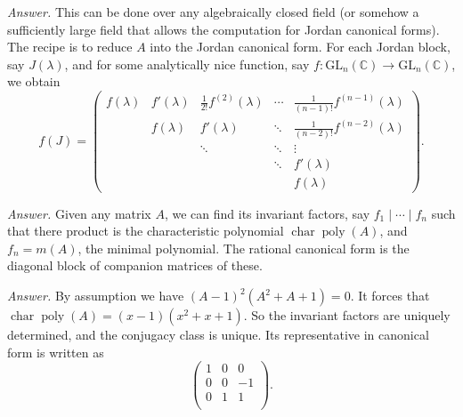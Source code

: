 \documentclass{mathproblems}
\newcommand\C{\mathbb{C}}
\newcommand\GL{\mathrm{GL}}
\begin{document}
\begin{questions}

\textit{Answer.} This can be done over any algebraically closed field (or somehow a sufficiently large field that allows the computation for Jordan canonical forms). The recipe is to reduce $A$ into the Jordan canonical form. For each Jordan block, say $J(\lambda)$, and for some analytically nice function, say $f:\GL_n(\C)\to \GL_n(\C)$, we obtain
$$
f(J)=\begin{pmatrix}
f(\lambda) & f'(\lambda) & \frac{1}{2!}f^{(2)}(\lambda) & \cdots & \frac{1}{(n-1)!}f^{(n-1)}(\lambda)\\
& f(\lambda) & f'(\lambda) & \ddots & \frac{1}{(n-2)!}f^{(n-2)}(\lambda)\\
& & \ddots & \ddots & \vdots \\
& & & \ddots & f'(\lambda) \\
& & & & f(\lambda)
\end{pmatrix}.
$$


\textit{Answer.} Given any matrix $A$, we can find its invariant factors, say $f_1\mid \cdots \mid f_n$ such that there product is the characteristic polynomial $\operatorname{char}\operatorname{poly}(A)$, and $f_n=m(A)$, the minimal polynomial. The rational canonical form is the diagonal block of companion matrices of these.


\textit{Answer.} By assumption we have $(A - 1)^2 (A^2 + A + 1)=0$. It forces that $\operatorname{char}\operatorname{poly}(A)=(x-1)(x^2 + x + 1)$. So the invariant factors are uniquely determined, and the conjugacy class is unique. Its representative in canonical form is written as
$$
\begin{pmatrix}
    1 & 0 & 0\\
    0 & 0 & -1\\
    0 & 1 & 1\\
\end{pmatrix}.
$$



\end{questions}
\end{document}
